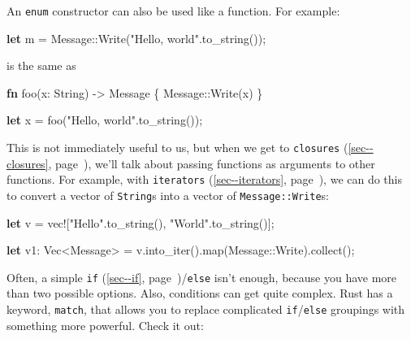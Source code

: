 \documentclass[a4paper,]{book}
\renewcommand*{\hyperref}[2][\ar]{%
  \def\ar{#2}%
  #2 (\autoref{#1}, page~\pageref{#1})}
\newenvironment{Shaded}{\begin{snugshade}}{\end{snugshade}}
\newcommand{\KeywordTok}[1]{\textcolor[rgb]{0.13,0.29,0.53}{\textbf{{#1}}}}
\newcommand{\StringTok}[1]{\textcolor[rgb]{0.31,0.60,0.02}{{#1}}}
\newcommand{\OtherTok}[1]{\textcolor[rgb]{0.56,0.35,0.01}{{#1}}}
\newcommand{\NormalTok}[1]{{#1}}
\begin{document}
An \texttt{enum} constructor can also be used like a function. For
example:

\begin{Shaded}
\begin{Highlighting}[]
\KeywordTok{let} \NormalTok{m = Message::Write(}\StringTok{"Hello, world"}\NormalTok{.to_string());}
\end{Highlighting}
\end{Shaded}

is the same as

\begin{Shaded}
\begin{Highlighting}[]
\KeywordTok{fn} \NormalTok{foo(x: String) -> Message \{}
    \NormalTok{Message::Write(x)}
\NormalTok{\}}

\KeywordTok{let} \NormalTok{x = foo(}\StringTok{"Hello, world"}\NormalTok{.to_string());}
\end{Highlighting}
\end{Shaded}

This is not immediately useful to us, but when we get to
\hyperref[sec--closures]{\texttt{closures}}, we'll talk about passing
functions as arguments to other functions. For example, with
\hyperref[sec--iterators]{\texttt{iterators}}, we can do this to convert
a vector of \texttt{String}s into a vector of \texttt{Message::Write}s:

\begin{Shaded}
\begin{Highlighting}[]

\KeywordTok{let} \NormalTok{v = }\OtherTok{vec!}\NormalTok{[}\StringTok{"Hello"}\NormalTok{.to_string(), }\StringTok{"World"}\NormalTok{.to_string()];}

\KeywordTok{let} \NormalTok{v1: Vec<Message> = v.into_iter().map(Message::Write).collect();}
\end{Highlighting}
\end{Shaded}


Often, a simple \hyperref[sec--if]{\texttt{if}}/\texttt{else} isn't
enough, because you have more than two possible options. Also,
conditions can get quite complex. Rust has a keyword, \texttt{match},
that allows you to replace complicated \texttt{if}/\texttt{else}
groupings with something more powerful. Check it out:
\end{document}
